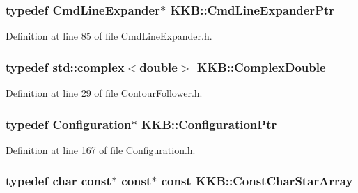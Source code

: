 \subsubsection[{\texorpdfstring{Cmd\+Line\+Expander\+Ptr}{CmdLineExpanderPtr}}]{\setlength{\rightskip}{0pt plus 5cm}typedef {\bf Cmd\+Line\+Expander}$\ast$ {\bf K\+K\+B\+::\+Cmd\+Line\+Expander\+Ptr}}\hypertarget{namespace_k_k_b_a6f834b5d389de3052a60ab4e17a6e626}{}\label{namespace_k_k_b_a6f834b5d389de3052a60ab4e17a6e626}


Definition at line 85 of file Cmd\+Line\+Expander.\+h.

\subsubsection[{\texorpdfstring{Complex\+Double}{ComplexDouble}}]{\setlength{\rightskip}{0pt plus 5cm}typedef std\+::complex$<$double$>$ {\bf K\+K\+B\+::\+Complex\+Double}}\hypertarget{namespace_k_k_b_a307e28915a31eb2034af6cb1d0d5fb88}{}\label{namespace_k_k_b_a307e28915a31eb2034af6cb1d0d5fb88}


Definition at line 29 of file Contour\+Follower.\+h.

\subsubsection[{\texorpdfstring{Configuration\+Ptr}{ConfigurationPtr}}]{\setlength{\rightskip}{0pt plus 5cm}typedef {\bf Configuration}$\ast$ {\bf K\+K\+B\+::\+Configuration\+Ptr}}\hypertarget{namespace_k_k_b_a7c58cf710b445e0fb89e66f37dda5fde}{}\label{namespace_k_k_b_a7c58cf710b445e0fb89e66f37dda5fde}


Definition at line 167 of file Configuration.\+h.

\subsubsection[{\texorpdfstring{Const\+Char\+Star\+Array}{ConstCharStarArray}}]{\setlength{\rightskip}{0pt plus 5cm}typedef char const$\ast$ const$\ast$ const {\bf K\+K\+B\+::\+Const\+Char\+Star\+Array}}\hypertarget{namespace_k_k_b_adfacaca3337ea9de79ba008a19aba556}{}\label{namespace_k_k_b_adfacaca3337ea9de79ba008a19aba556}


